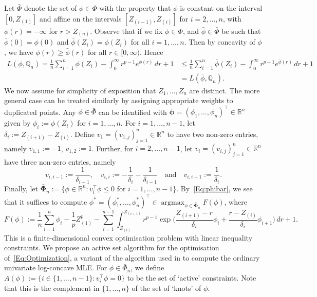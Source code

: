 \documentclass[a4paper,12pt]{article}
\DeclareMathOperator*{\argmax}{argmax}
\begin{document}
Let $\bar{\Phi}$ denote the set of $\phi \in \Phi$ with the property that $\phi$ is constant on the interval $[0,Z_{(1)}]$ and affine on the intervals $[Z_{(i-1)},Z_{(i)}]$ for $i=2,\ldots,n$, with $\phi(r) = -\infty$ for $r > Z_{(n)}$.  Observe that if we fix $\phi \in \Phi$, and $\bar{\phi} \in \bar{\Phi}$ be such that $\bar{\phi}(0) = \phi(0)$ and $\bar{\phi}(Z_i) = \phi(Z_i)$ for all $i=1,\ldots,n$. Then by concavity of $\phi$, we have $\phi(r) \geq \bar{\phi}(r)$ for all $r \in [0, \infty)$.  Hence
\begin{align}
\label{Eq:phibar}
L(\phi, \mathbb{Q}_n) = \frac{1}{n}\sum_{i=1}^n \phi(Z_i) - \int_0^\infty r^{p-1} e^{\phi(r)} \, dr +1 &\leq
    \frac{1}{n}\sum_{i=1}^n \bar{\phi}(Z_i) - \int_0^\infty  r^{p-1} e^{\bar{\phi}(r)} \, dr +1 \nonumber \\
&= L(\bar{\phi},\mathbb{Q}_n).
\end{align}
We now assume for simplicity of exposition that $Z_1,\ldots,Z_n$ are distinct.  The more general case can be treated similarly by assigning appropriate weights to duplicated points.  Any $\phi \in \bar{\Phi}$ can be identified with $\mathbf{\phi} = (\phi_1,\ldots,\phi_n)^\top \in \mathbb{R}^n$ given by $\phi_i := \phi(Z_i)$ for $i=1,\ldots,n$.  For $i=1,\ldots,n-1$, let $\delta_i := Z_{(i+1)} - Z_{(i)}$.  Define $v_1 = (v_{1,j})_{j=1}^n \in \mathbb{R}^n$ to have two non-zero entries, namely $v_{1,1} := -1$, $v_{1,2} := 1$.  Further, for $i=2,\ldots,n-1$, let $v_i = (v_{i,j})_{j=1}^n \in \mathbb{R}^n$ have three non-zero entries, namely
\[
v_{i,i-1} := \frac{1}{\delta_{i-1}}, \quad v_{i,i} := -\frac{1}{\delta_i} - \frac{1}{\delta_{i-1}} \quad \text{and} \quad v_{i,i+1} := \frac{1}{\delta_i}.
\]
Finally, let $\bar{\mathbf{\Phi}}_n := \bigl\{\phi \in \mathbb{R}^n: v_i^{\top} \phi \leq 0 \text{ for } i=1,\ldots, n-1\bigr\}$.  By~\eqref{Eq:phibar}, we see that it suffices to compute $\phi^* = (\phi_1^*,\ldots,\phi_n^*)^\top \in \argmax_{\phi \in \bar{\mathbf{\Phi}}_n} F(\phi)$, where
\begin{equation}
\label{Eq:Optimization}
F(\phi) := \frac{1}{n} \sum_{i=1}^n \phi_i - \frac{1}{p}Z_{(1)}^p - \sum_{i=1}^{n-1} \int_{Z_{(i)}}^{Z_{(i+1)}}
   r^{p-1} \exp \biggl( \frac{Z_{(i+1)} - r}{\delta_i} \phi_i +
    \frac{r - Z_{(i)}}{\delta_i} \phi_{i+1} \biggr) \,dr + 1. 
\end{equation}
This is a finite-dimensional convex optimisation problem with linear inequality constraints.  We propose an active set algorithm for the optimisation of~\eqref{Eq:Optimization}, a variant of the algorithm used in \cite{dumbgen2007active} to compute the ordinary univariate log-concave MLE. For $\phi \in \bar{\Phi}_n$, we define $A(\phi) := \bigl\{i \in \{1,\ldots,n-1\}:v_i^\top\phi = 0 \bigr\}$ to be the set of `active' constraints.  Note that this is the complement in $\{1,\ldots,n\}$ of the set of `knots' of $\phi$.
\end{document}
